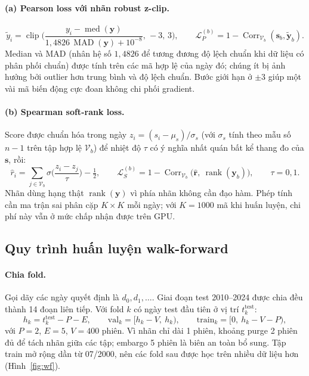 \documentclass[a4paper,12pt]{article}
\DeclareMathOperator{\Corr}{Corr}
\DeclareMathOperator{\rk}{rank}
\DeclareMathOperator{\med}{med}
\DeclareMathOperator{\MAD}{MAD}
\DeclareMathOperator{\clip}{clip}
\begin{document}
\paragraph{(a) Pearson loss với nhãn robust z-clip.}
\begin{equation}
    \tilde y_i=\clip\!\Big(\frac{y_i-\med(\mathbf{y})}{1{,}4826\,\MAD(\mathbf{y})+10^{-8}},\,-3,\,3\Big),\qquad
    \mathcal{L}_{P}^{(b)}=1-\Corr_{\mathcal{V}_b}(\mathbf{s}_b,\tilde{\mathbf{y}}_b).
\end{equation}
Median và MAD (nhân hệ số $1{,}4826$ để tương đương độ lệch chuẩn khi dữ liệu có phân phối chuẩn) được tính trên các mã hợp lệ của ngày đó; chúng ít bị ảnh hưởng bởi outlier hơn trung bình và độ lệch chuẩn. Bước giới hạn ở $\pm3$ giúp một vài mã biến động cực đoan không chi phối gradient.

\paragraph{(b) Spearman soft-rank loss.} Score được chuẩn hóa trong ngày $z_i=(s_i-\mu_s)/\sigma_s$ (với $\sigma_s$ tính theo mẫu số $n-1$ trên tập hợp lệ $\mathcal{V}_b$) để nhiệt độ $\tau$ có ý nghĩa nhất quán bất kể thang đo của $\mathbf{s}$, rồi:
\begin{equation}
    \hat r_i=\sum_{j\in\mathcal{V}_b}\sigma\!\Big(\frac{z_i-z_j}{\tau}\Big)-\tfrac12,\qquad
    \mathcal{L}_{S}^{(b)}=1-\Corr_{\mathcal{V}_b}\big(\hat{\mathbf{r}},\ \rk(\mathbf{y}_b)\big),\qquad \tau=0{,}1.
\end{equation}
Nhãn dùng hạng thật $\rk(\mathbf{y})$ vì phía nhãn không cần đạo hàm. Phép tính cần ma trận sai phân cặp $K\times K$ mỗi ngày; với $K=1000$ mã khi huấn luyện, chi phí này vẫn ở mức chấp nhận được trên GPU.

\subsection{Quy trình huấn luyện walk-forward}
\paragraph{Chia fold.} Gọi dãy các ngày quyết định là $d_0,d_1,\dots$. Giai đoạn test 2010--2024 được chia đều thành 14 đoạn liên tiếp. Với fold $k$ có ngày test đầu tiên ở vị trí $t^{\mathrm{test}}_{k}$:
\begin{equation}
    h_k=t^{\mathrm{test}}_{k}-P-E,\qquad
    \mathrm{val}_k=[h_k-V,\ h_k),\qquad
    \mathrm{train}_k=[0,\ h_k-V-P),
\end{equation}
với $P=2$, $E=5$, $V=400$ phiên. Vì nhãn chỉ dài 1 phiên, khoảng purge 2 phiên đủ để tách nhãn giữa các tập; embargo 5 phiên là biên an toàn bổ sung. Tập train mở rộng dần từ 07/2000, nên các fold sau được học trên nhiều dữ liệu hơn (Hình~\ref{fig:wf}).
\end{document}
